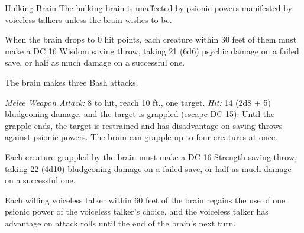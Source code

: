 \documentclass[10pt,a4paper,twoside,bg=print,twocolumn,openany,nodeprecatedcode]{dndbook}
\begin{document}
\begin{DndMonster}[float=t]{Hulking Brain}
\DndMonsterBasics[
armor-class = {16 (natural armor)},
hit-points = {\DndDice{12d10 + 60}},
speed = {30 ft.}
]
\DndMonsterAbilityScores[
 str = 21,
 dex = 10,
 con = 20,
 int = 8,
 wis = 6,
 cha = 12
]
\DndMonsterDetails[
senses = {blindsight 120 ft. (blind beyond this radius), passive perception 8},
languages = {Deep Speech, Undercommon, telepathy 120 ft.},
challenge = 7,
]
The hulking brain is unaffected by psionic powers manifested by voiceless talkers unless the brain wishes to be.

When the brain drops to 0 hit points, each creature within 30 feet of them must make a DC 16 Wisdom saving throw, taking 21 (6d6) psychic damage on a failed save, or half as much damage on a successful one.

The brain makes three Bash attacks.

\textsl{Melee Weapon Attack:} 8 to hit, reach 10 ft., one target. \textsl{Hit:} 14 (2d8 + 5) bludgeoning damage, and the target is grappled (escape DC 15). Until the grapple ends, the target is restrained and has disadvantage on saving throws against psionic powers. The brain can grapple up to four creatures at once.

Each creature grappled by the brain must make a DC 16 Strength saving throw, taking 22 (4d10) bludgeoning damage on a failed save, or half as much damage on a successful one.

Each willing voiceless talker within 60 feet of the brain regains the use of one psionic power of the voiceless talker's choice, and the voiceless talker has advantage on attack rolls until the end of the brain's next turn.

\end{DndMonster}
\end{document}
